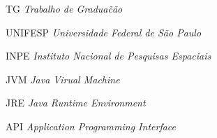 \begin{siglas}
    \item[TG] \emph{Trabalho de Gradua\~c\~ao}
    \item[UNIFESP] \emph{Universidade Federal de São Paulo}
    \item[INPE] \emph{Instituto Nacional de Pesquisas Espaciais}
    \item[JVM] \emph{Java Virual Machine}
    \item[JRE] \emph{Java Runtime Environment}
    \item[API] \emph{Application Programming Interface}
\end{siglas}